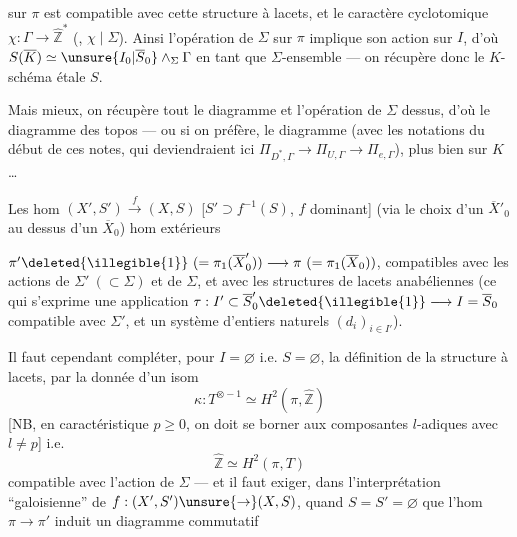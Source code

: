 
   sur $\pi$ est
compatible avec cette structure à lacets,
et le caractère cyclotomique $\chi:\Gamma\to\widehat{\mathbb Z}^{*}$
(, $\chi\mid\Sigma$). Ainsi l'opération de
$\Sigma$ sur $\pi$ implique son action sur $I$, d'où
$S(\overline K)\simeq\unsure{I_0|\overline S_0}\wedge_{\Sigma}\Gamma$ en tant que $\Sigma$-ensemble
--- on récupère donc le $K$-schéma étale $S$.

Mais mieux, on récupère tout le
diagramme
et l'opération de $\Sigma$ dessus, d'où le
diagramme des topos  --- ou si
on préfère, le diagramme
(avec les notations du début de ces notes,
qui deviendraient ici $\Pi_{D^{*},\Gamma}\to\Pi_{U,\Gamma}\to\Pi_{e,\Gamma}$),
plus bien sur $K$\dots

Les hom $(X',S')\xrightarrow{f}(X,S)$
[$S'\supset f^{-1}(S)$, $f$ dominant]  
  (via le choix d'un $\overline X'_0$
au dessus d'un $\overline X_0$)   hom extérieurs



$\pi'\deleted{\illegible{1}}\ (=\pi_1(\overline X'_0))\longrightarrow\pi\ (=\pi_1(\overline X_0))$, compatibles
avec les actions de $\Sigma'\ (\subset\Sigma)$ et de $\Sigma$,
et avec les structures de lacets anabéliennes
(ce qui s'exprime   une application
$\tau:I'\subset\overline S'_0\deleted{\illegible{1}}\longrightarrow I=\overline S_0$ compatible avec
$\Sigma'$, et un système d'entiers naturels
$(d_i)_{i\in I'}$).

Il faut cependant compléter,  pour
$I=\varnothing$ i.e. $S=\varnothing$, la définition de la
structure à lacets, par la donnée d'un
isom
\[
\kappa:T^{\otimes-1}\simeq H^2(\pi,\widehat{\mathbb Z})
\]
[NB, en caractéristique $p\geq0$, on doit se borner
aux composantes $l$-adiques avec $l\ne p$]
i.e.
\[
\widehat{\mathbb Z}\simeq H^2(\pi,T)
\]
compatible avec l'action de $\Sigma$
--- et il faut exiger, dans l'interprétation
``galoisienne'' de $f:(X',S')\unsure{\to}(X,S)$, quand $S=S'=\varnothing$
que l'hom $\pi\to\pi'$ induit un
diagramme commutatif

